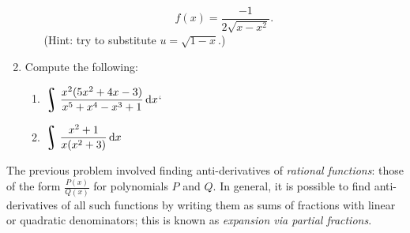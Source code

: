 \begin{enumerate}
\begin{enumerate}
            \begin{displaymath}
              f(x) = \frac{-1}{2\sqrt{x - x^2}}.
            \end{displaymath}
            (Hint: try to substitute $ u = \sqrt{1 - x} $.)
    \end{enumerate}
  \item Compute the following:
    \begin{enumerate}
      \item $ \displaystyle\rint \dfrac{x^2(5x^2 + 4x - 3)}{x^5 + x^4 - x^3 + 1} \dif{x} $`
       \item $ \displaystyle\rint \dfrac{x^2 + 1}{x(x^2 + 3)} \dif{x} $
    \end{enumerate}
\end{enumerate}
The previous problem involved finding anti-derivatives of \emph{rational functions}: those of the form $ \frac{P(x)}{Q(x)} $
for polynomials $ P $ and $ Q $. In general, it is possible to find anti-derivatives of all such functions by writing them
as sums of fractions with linear or quadratic denominators; this is known as \emph{expansion via partial fractions}.
